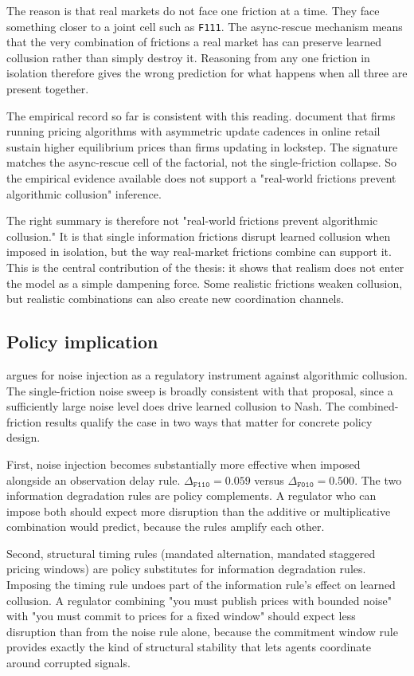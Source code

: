 The reason is that real markets do not face one friction at a time. They face something closer to a joint cell such as \texttt{F111}. The async-rescue mechanism means that the very combination of frictions a real market has can preserve learned collusion rather than simply destroy it. Reasoning from any one friction in isolation therefore gives the wrong prediction for what happens when all three are present together.

The empirical record so far is consistent with this reading. \citet{brown2023} document that firms running pricing algorithms with asymmetric update cadences in online retail sustain higher equilibrium prices than firms updating in lockstep. The signature matches the async-rescue cell of the factorial, not the single-friction collapse. So the empirical evidence available does not support a "real-world frictions prevent algorithmic collusion" inference.

The right summary is therefore not "real-world frictions prevent algorithmic collusion." It is that single information frictions disrupt learned collusion when imposed in isolation, but the way real-market frictions combine can support it. This is the central contribution of the thesis: it shows that realism does not enter the model as a simple dampening force. Some realistic frictions weaken collusion, but realistic combinations can also create new coordination channels.

\subsection{Policy implication}

\citet{zhang2025} argues for noise injection as a regulatory instrument against algorithmic collusion. The single-friction noise sweep is broadly consistent with that proposal, since a sufficiently large noise level does drive learned collusion to Nash. The combined-friction results qualify the case in two ways that matter for concrete policy design.

First, noise injection becomes substantially more effective when imposed alongside an observation delay rule. $\Delta_{\texttt{F110}} = 0.059$ versus $\Delta_{\texttt{F010}} = 0.500$. The two information degradation rules are policy complements. A regulator who can impose both should expect more disruption than the additive or multiplicative combination would predict, because the rules amplify each other.

Second, structural timing rules (mandated alternation, mandated staggered pricing windows) are policy substitutes for information degradation rules. Imposing the timing rule undoes part of the information rule's effect on learned collusion. A regulator combining "you must publish prices with bounded noise" with "you must commit to prices for a fixed window" should expect less disruption than from the noise rule alone, because the commitment window rule provides exactly the kind of structural stability that lets agents coordinate around corrupted signals.

